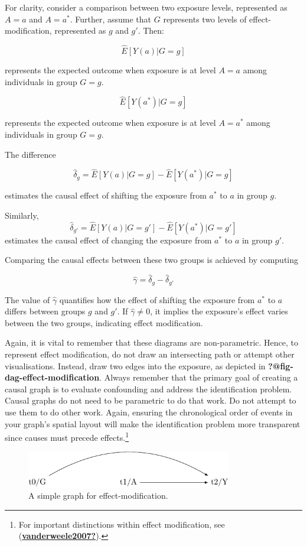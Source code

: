 \documentclass[
  singlecolumn]{report}
\begin{document}
For clarity, consider a comparison between two exposure levels,
represented as \(A = a\) and \(A= a^*\). Further, assume that \(G\)
represents two levels of effect-modification, represented as \(g\) and
\(g'\). Then:

\[\hat{E}[Y(a)|G=g]\]

represents the expected outcome when exposure is at level \(A=a\) among
individuals in group \(G=g\).

\[\hat{E}[Y(a^*)|G=g]\]

represents the expected outcome when exposure is at level \(A=a^*\)
among individuals in group \(G=g\).

The difference

\[\hat{\delta}_g = \hat{E}[Y(a)|G=g] - \hat{E}[Y(a^*)|G=g]\]

estimates the causal effect of shifting the exposure from \(a^*\) to
\(a\) in group \(g\).

Similarly,
\[\hat{\delta}_{g'} = \hat{E}[Y(a)|G=g'] - \hat{E}[Y(a^*)|G=g']\]
estimates the causal effect of changing the exposure from \(a^*\) to
\(a\) in group \(g'\).

Comparing the causal effects between these two groups is achieved by
computing

\[\hat{\gamma} = \hat{\delta}_g - \hat{\delta}_{g'}\]

The value of \(\hat{\gamma}\) quantifies how the effect of shifting the
exposure from \(a^*\) to \(a\) differs between groups \(g\) and \(g'\).
If \(\hat{\gamma}\neq 0\), it implies the exposure's effect varies
between the two groups, indicating effect modification.

Again, it is vital to remember that these diagrams are non-parametric.
Hence, to represent effect modification, do not draw an intersecting
path or attempt other visualisations. Instead, draw two edges into the
exposure, as depicted in \textbf{?@fig-dag-effect-modification}. Always
remember that the primary goal of creating a causal graph is to evaluate
confounding and address the identification problem. Causal graphs do not
need to be parametric to do that work. Do not attempt to use them to do
other work. Again, ensuring the chronological order of events in your
graph's spatial layout will make the identification problem more
transparent since causes must precede effects.\footnote{For important
  distinctions within effect modification, see
  (\protect\hyperlink{ref-vanderweele2007}{\textbf{vanderweele2007?}}).}

\begin{figure}

{\centering \includegraphics[width=0.8\textwidth,height=\textheight]{causal-dags_files/figure-pdf/fig-dag-effect-modfication-1.pdf}

}

\caption{\label{fig-dag-effect-modfication}A simple graph for
effect-modification.}

\end{figure}
\end{document}
